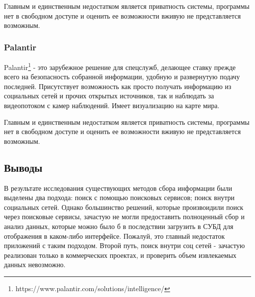 \par
Главным и единственным недостатком является приватность системы, программы нет в свободном доступе и оценить ее возможности
вживую не представляется возможным.

\subsubsection{Palantir}
Palantir\footnote{https://www.palantir.com/solutions/intelligence/} - это зарубежное решение для спецслужб, делающее ставку 
прежде всего на безопасность собранной информации, удобную и развернутую подачу последней. Присутствует возможность как просто
получать информацию из социальных сетей и прочих открытых источников, так и наблюдать за видеопотоком с камер наблюдений. Имеет
визуализацию на карте мира.


\par
Главным и единственным недостатком является приватность системы, программы нет в свободном доступе и оценить ее возможности
вживую не представляется возможным.

\subsection{Выводы}
В результате исследования существующих методов сбора информации были выделены два подхода: поиск с помощью поисковых сервисов;
поиск внутри социальных сетей. Однако большинство решений, которые произвоидили поиск через поисковые сервисы, зачастую не могли
предоставить полноценный сбор и анализ данных, которые можно было б в последствии загрузить в СУБД для отображения в каком-либо
интерфейсе. Пожалуй, это главный недостаток приложений с таким подходом. Второй путь, поиск внутри соц сетей - зачастую реализован
только в коммерческих проектах, и проверить объем извлекаемых данных невозможно.